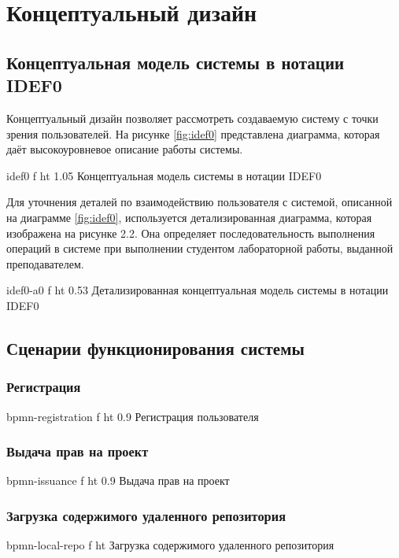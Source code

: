 \documentclass{bmstu}
\begin{document}
  \chapter{Концептуальный дизайн}
  
  \section{Концептуальная модель системы в нотации IDEF0}
  
  Концептуальный дизайн позволяет рассмотреть создаваемую систему с
  точки зрения пользователей. На рисунке \ref{fig:idef0} представлена диаграмма,
  которая даёт высокоуровневое описание работы системы.
  
  {idef0}
  {f}
  {ht}
  {1.05\textwidth}
  {Концептуальная модель системы в нотации IDEF0}
  \label{fig:idef0}
  
  Для уточнения деталей по взаимодействию пользователя с системой, описанной 
  на диаграмме \ref{fig:idef0}, используется детализированная диаграмма, которая изображена
  на рисунке 2.2. Она определяет последовательность выполнения операций в системе
  при выполнении студентом лабораторной работы, выданной преподавателем.
  
  {idef0-a0}
  {f}
  {ht}
  {0.53\textwidth}
  {Детализированная концептуальная модель системы в нотации IDEF0}
  \label{fig:idef0-a0}
  
\section{Сценарии функционирования системы}

\subsection*{Регистрация}
{bpmn-registration}
{f}
{ht}
{0.9 \textwidth}
{Регистрация пользователя}
\FloatBarrier

\subsection*{Выдача прав на проект}
{bpmn-issuance}
{f}
{ht}
{0.9 \textwidth}
{Выдача прав на проект}
\FloatBarrier

\subsection*{Загрузка содержимого удаленного репозитория}
{bpmn-local-repo}
{f}
{ht}
{\textwidth}
{Загрузка содержимого удаленного репозитория}
\FloatBarrier
\end{document}
